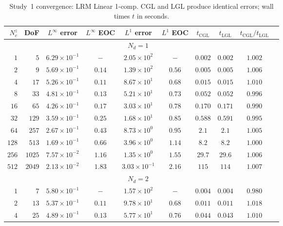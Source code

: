 \begin{table}[htbp]
\centering
\caption{Study~1 convergence: LRM Linear 1-comp. CGL and LGL produce identical errors; wall times $t$ in seconds.}
\label{tab:study1_lin_1comp}
\small
\begin{tabular}{rr ccc cc cc c}
\toprule
$N_e^z$ & DoF & $L^\infty$ error & $L^\infty$ EOC & $L^1$ error & $L^1$ EOC & $t_\text{CGL}$ & $t_\text{LGL}$ & $t_\text{CGL}/t_\text{LGL}$ \\
\midrule
\midrule
\multicolumn{9}{c}{\textbf{$N_d = 1$}} \\
\midrule
$1$ & $5$ & $6.29\times 10^{-1}$ & $-$ & $2.05\times 10^{2}$ & $-$ & $0.002$ & $0.002$ & $1.002$ \\
$2$ & $9$ & $5.69\times 10^{-1}$ & $0.14$ & $1.39\times 10^{2}$ & $0.56$ & $0.005$ & $0.005$ & $1.006$ \\
$4$ & $17$ & $5.26\times 10^{-1}$ & $0.11$ & $8.67\times 10^{1}$ & $0.68$ & $0.015$ & $0.015$ & $1.010$ \\
$8$ & $33$ & $4.81\times 10^{-1}$ & $0.13$ & $5.21\times 10^{1}$ & $0.73$ & $0.052$ & $0.052$ & $0.996$ \\
$16$ & $65$ & $4.26\times 10^{-1}$ & $0.17$ & $3.03\times 10^{1}$ & $0.78$ & $0.170$ & $0.171$ & $0.990$ \\
$32$ & $129$ & $3.59\times 10^{-1}$ & $0.25$ & $1.68\times 10^{1}$ & $0.85$ & $0.588$ & $0.591$ & $0.995$ \\
$64$ & $257$ & $2.67\times 10^{-1}$ & $0.43$ & $8.73\times 10^{0}$ & $0.95$ & $2.1$ & $2.1$ & $1.005$ \\
$128$ & $513$ & $1.69\times 10^{-1}$ & $0.66$ & $3.96\times 10^{0}$ & $1.14$ & $8.2$ & $8.2$ & $1.000$ \\
$256$ & $1025$ & $7.57\times 10^{-2}$ & $1.16$ & $1.35\times 10^{0}$ & $1.55$ & $29.7$ & $29.6$ & $1.006$ \\
$512$ & $2049$ & $2.13\times 10^{-2}$ & $1.83$ & $3.03\times 10^{-1}$ & $2.16$ & $115$ & $114$ & $1.007$ \\
\midrule
\multicolumn{9}{c}{\textbf{$N_d = 2$}} \\
\midrule
$1$ & $7$ & $5.80\times 10^{-1}$ & $-$ & $1.57\times 10^{2}$ & $-$ & $0.004$ & $0.004$ & $0.980$ \\
$2$ & $13$ & $5.37\times 10^{-1}$ & $0.11$ & $9.78\times 10^{1}$ & $0.68$ & $0.011$ & $0.011$ & $1.018$ \\
$4$ & $25$ & $4.89\times 10^{-1}$ & $0.13$ & $5.77\times 10^{1}$ & $0.76$ & $0.044$ & $0.043$ & $1.010$ \\

\end{tabular}
\end{table}
